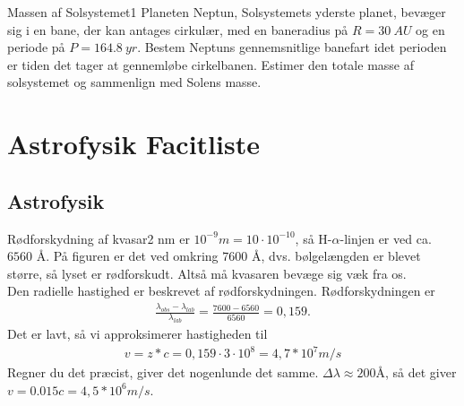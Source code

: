 \begin{opgave}{Massen af Solsystemet}{1}
	Planeten Neptun, Solsystemets yderste planet, bevæger sig i en bane, der kan antages cirkulær, med  en baneradius på $R=\SI{30}{AU}$ og en periode på $P=\SI{164,8}{yr}$.
	\opg Bestem Neptuns gennemsnitlige banefart idet perioden er tiden det tager at gennemløbe cirkelbanen.
	\opg Estimer den totale masse af solsystemet og sammenlign med Solens masse.
\end{opgave}

\chapter{Astrofysik Facitliste}
\section*{Astrofysik}
\begin{opgave}{Rødforskydning af kvasar}{2}
	\opg nm er $10^{-9} m= 10 \cdot 10^{-10}$, så H-$\alpha$-linjen er ved ca. $6560$ Å. På figuren er det ved omkring $7600$ Å, dvs. bølgelængden er blevet større, så lyset er rødforskudt. Altså må kvasaren bevæge sig væk fra os.\\
	\opg Den radielle hastighed er beskrevet af rødforskydningen. Rødforskydningen er
	\begin{align}
	\frac{\lambda_{obs}-\lambda_{lab}}{\lambda_{lab}} = \frac{7600-6560}{6560} = 0,159.
	\end{align}
	Det er lavt, så vi approksimerer hastigheden til
	\begin{align}
	v= z*c = 0,159 \cdot 3\cdot 10^8 = 4,7*10^7 m/s
	\end{align}
	Regner du det præcist, giver det nogenlunde det samme.
	\opg $\Delta\lambda \approx 200 Å$, så det giver $v=0.015 c = 4,5*10^6 m/s$.
\end{opgave}

